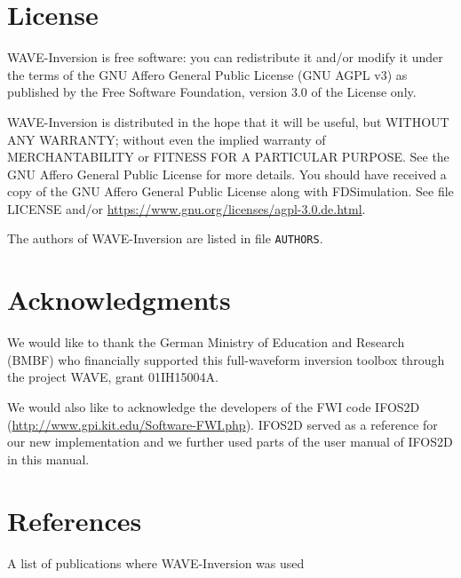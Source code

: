 \documentclass[pdftex,a4paper,parskip,listof=totoc,bibliography=totoc,onehalfspacing,12pt]{scrreprt}
\begin{document}
\tableofcontents %



\setcounter{page}{1}

\cleardoublepage
\chapter*{License}

WAVE-Inversion is free software: you can redistribute it and/or modify it under the terms of the GNU Affero General Public License (GNU AGPL v3) as published by the Free Software Foundation, version 3.0 of the License only.
 
WAVE-Inversion is distributed in the hope that it will be useful, but WITHOUT ANY WARRANTY; without even the implied warranty of MERCHANTABILITY or FITNESS FOR A PARTICULAR PURPOSE. See the GNU Affero General Public License for more details. You should have received a copy of the GNU Affero General Public License along with FDSimulation. See file LICENSE and/or \url{https://www.gnu.org/licenses/agpl-3.0.de.html}.

The authors of WAVE-Inversion are listed in file \lstinline{AUTHORS}.

\chapter*{Acknowledgments}

We would like to thank the German Ministry of Education and Research (BMBF) who financially supported this full-waveform inversion toolbox through the project WAVE, grant 01IH15004A.

We would also like to acknowledge the developers of the FWI code IFOS2D (\url{http://www.gpi.kit.edu/Software-FWI.php}). IFOS2D served as a reference for our new implementation and we further used parts of the user manual of IFOS2D in this manual.

\chapter*{References}

A list of publications where WAVE-Inversion was used


\cleardoublepage
\end{document}
